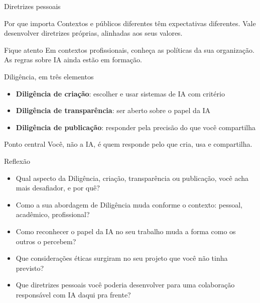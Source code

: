 \documentclass[aspectratio=169,11pt]{beamer}
\begin{document}
\begin{frame}{Diretrizes pessoais}
  \begin{notebox}{Por que importa}
    \small Contextos e públicos diferentes têm expectativas diferentes. Vale desenvolver diretrizes próprias, alinhadas aos seus valores.
  \end{notebox}
  \vspace{0.25cm}
  \begin{alertbox}{Fique atento}
    \small Em contextos profissionais, conheça as políticas da sua organização. As regras sobre IA ainda estão em formação.
  \end{alertbox}
\end{frame}

\begin{frame}{Diligência, em três elementos}
  \begin{itemize}
    \item \textbf{Diligência de criação}: escolher e usar sistemas de IA com critério
    \item \textbf{Diligência de transparência}: ser aberto sobre o papel da IA
    \item \textbf{Diligência de publicação}: responder pela precisão do que você compartilha
  \end{itemize}
  \vspace{0.3cm}
  \begin{alertbox}{Ponto central}
    \small Você, não a IA, é quem responde pelo que cria, usa e compartilha.
  \end{alertbox}
\end{frame}

\begin{frame}{Reflexão}
  \begin{itemize}
    \item Qual aspecto da Diligência, criação, transparência ou publicação, você acha mais desafiador, e por quê?
    \item Como a sua abordagem de Diligência muda conforme o contexto: pessoal, acadêmico, profissional?
    \item Como reconhecer o papel da IA no seu trabalho muda a forma como os outros o percebem?
    \item Que considerações éticas surgiram no seu projeto que você não tinha previsto?
    \item Que diretrizes pessoais você poderia desenvolver para uma colaboração responsável com IA daqui pra frente?
  \end{itemize}
\end{frame}
\end{document}
